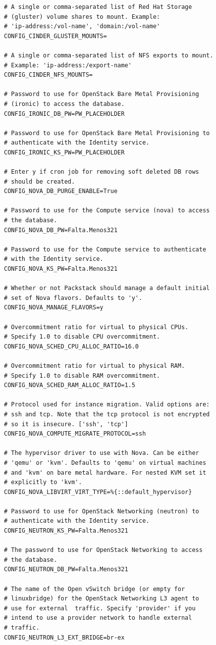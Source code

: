 \documentclass[12pt,a4paper,oneside]{book}
\begin{document}
\begin{lstlisting}[style=codigobase,  caption= answers.cfg]
# A single or comma-separated list of Red Hat Storage 
# (gluster) volume shares to mount. Example: 
# 'ip-address:/vol-name', 'domain:/vol-name'
CONFIG_CINDER_GLUSTER_MOUNTS=

# A single or comma-separated list of NFS exports to mount.
# Example: 'ip-address:/export-name'
CONFIG_CINDER_NFS_MOUNTS=

# Password to use for OpenStack Bare Metal Provisioning 
# (ironic) to access the database.
CONFIG_IRONIC_DB_PW=PW_PLACEHOLDER

# Password to use for OpenStack Bare Metal Provisioning to
# authenticate with the Identity service.
CONFIG_IRONIC_KS_PW=PW_PLACEHOLDER

# Enter y if cron job for removing soft deleted DB rows
# should be created.
CONFIG_NOVA_DB_PURGE_ENABLE=True

# Password to use for the Compute service (nova) to access
# the database.
CONFIG_NOVA_DB_PW=Falta.Menos321

# Password to use for the Compute service to authenticate 
# with the Identity service.
CONFIG_NOVA_KS_PW=Falta.Menos321

# Whether or not Packstack should manage a default initial
# set of Nova flavors. Defaults to 'y'.
CONFIG_NOVA_MANAGE_FLAVORS=y

# Overcommitment ratio for virtual to physical CPUs. 
# Specify 1.0 to disable CPU overcommitment.
CONFIG_NOVA_SCHED_CPU_ALLOC_RATIO=16.0

# Overcommitment ratio for virtual to physical RAM. 
# Specify 1.0 to disable RAM overcommitment.
CONFIG_NOVA_SCHED_RAM_ALLOC_RATIO=1.5

# Protocol used for instance migration. Valid options are:
# ssh and tcp. Note that the tcp protocol is not encrypted
# so it is insecure. ['ssh', 'tcp']
CONFIG_NOVA_COMPUTE_MIGRATE_PROTOCOL=ssh

# The hypervisor driver to use with Nova. Can be either
# 'qemu' or 'kvm'. Defaults to 'qemu' on virtual machines 
# and 'kvm' on bare metal hardware. For nested KVM set it 
# explicitly to 'kvm'.
CONFIG_NOVA_LIBVIRT_VIRT_TYPE=%{::default_hypervisor}

# Password to use for OpenStack Networking (neutron) to 
# authenticate with the Identity service.
CONFIG_NEUTRON_KS_PW=Falta.Menos321

# The password to use for OpenStack Networking to access
# the database.
CONFIG_NEUTRON_DB_PW=Falta.Menos321

# The name of the Open vSwitch bridge (or empty for 
# linuxbridge) for the OpenStack Networking L3 agent to 
# use for external  traffic. Specify 'provider' if you 
# intend to use a provider network to handle external 
# traffic.
CONFIG_NEUTRON_L3_EXT_BRIDGE=br-ex


\end{lstlisting}
\end{document}
